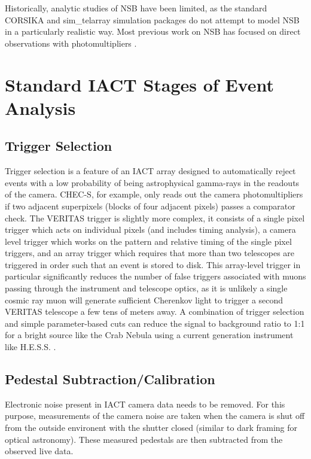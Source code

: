 Historically, analytic studies of NSB have been limited, as the standard CORSIKA and sim\_telarray simulation packages do not attempt to model NSB in a particularly realistic way. Most previous work on NSB has focused on direct observations with photomultipliers \cite{BandE}. 

\section{Standard IACT Stages of Event Analysis}\label{app:imaging}

\subsection{Trigger Selection}

Trigger selection is a feature of an IACT array designed to automatically reject events with a low probability of being astrophysical gamma-rays in the readouts of the camera. CHEC-S, for example, only reads out the camera photomultipliers if two adjacent superpixels (blocks of four adjacent pixels) passes a comparator check. The VERITAS trigger is slightly more complex, it consists of a single pixel trigger which acts on individual pixels (and includes timing analysis), a camera level trigger which works on the pattern and relative timing of the single pixel triggers, and an array trigger which requires that more than two telescopes are triggered in order such that an event is stored to disk\cite{veritastrigger}. This array-level trigger in particular significantly reduces the number of false triggers associated with muons passing through the instrument and telescope optics, as it is unlikely a single cosmic ray muon will generate sufficient Cherenkov light to trigger a second VERITAS telescope a few tens of meters away. A combination of trigger selection and simple parameter-based cuts can reduce the signal to background ratio to 1:1 for a bright source like the Crab Nebula using a current generation instrument like H.E.S.S. \cite{Berge07}.

\subsection{Pedestal Subtraction/Calibration}

Electronic noise present in IACT camera data needs to be removed. For this purpose, measurements of the camera noise are taken when the camera is shut off from the outside environent with the shutter closed (similar to dark framing for optical astronomy). These measured pedestals are then subtracted from the observed live data.

